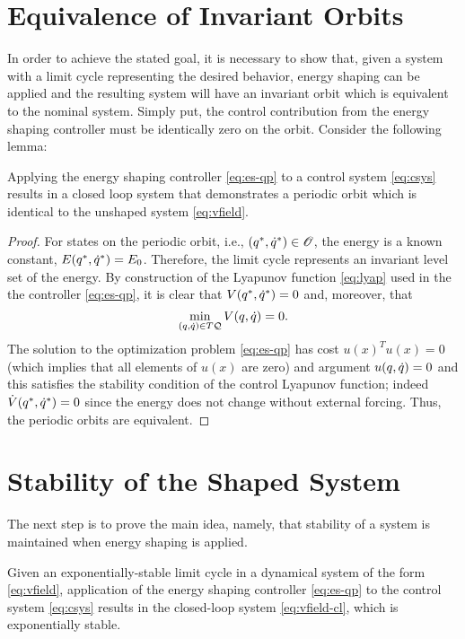\documentclass[twocolumn]{article}
\begin{document}
\section{Equivalence of Invariant Orbits}
In order to achieve the stated goal, it is necessary to show that, given a system with a limit cycle representing the desired behavior, energy shaping can be applied and the resulting system will have an invariant orbit which is equivalent to the nominal system. Simply put, the control contribution from the energy shaping controller must be identically zero on the orbit. Consider the following lemma:

\begin{lemma}
  Applying the energy shaping controller \eqref{eq:es-qp} to a control system \eqref{eq:csys} results in a closed loop system that demonstrates a periodic orbit which is identical to the unshaped system \eqref{eq:vfield}.
\end{lemma}

\begin{proof}
  For states on the periodic orbit, i.e., $(q^{*}, \dot{q}^{*}) \in \mathscr{O}$, the energy is a known constant, $E(q^{*}, \dot{q}^{*}) = E_{0}$.
  Therefore, the limit cycle represents an invariant level set of the energy.
  By construction of the Lyapunov function \eqref{eq:lyap} used in the the controller \eqref{eq:es-qp}, it is clear that $V(q^{*}, \dot{q}^{*}) = 0$ and, moreover, that $$\min_{(q, \dot{q}) \in T\mathcal{Q}} V(q, \dot{q}) = 0.$$
  The solution to the optimization problem \eqref{eq:es-qp} has cost $u(x)^T u(x) = 0$ (which implies that all elements of $u(x)$ are zero) and argument $u(q, \dot{q}) = 0$ and this satisfies the stability condition of the control Lyapunov function; indeed ${\dot V}(q^{*}, \dot{q}^{*}) = 0$ since the energy does not change without external forcing.
  Thus, the periodic orbits are equivalent.
\end{proof}

\section{Stability of the Shaped System}

The next step is to prove the main idea, namely, that stability of a system is maintained when energy shaping is applied.

\begin{theorem}
  Given an exponentially-stable limit cycle in a dynamical system of the form \eqref{eq:vfield}, application of the energy shaping controller \eqref{eq:es-qp} to the control system \eqref{eq:csys} results in the closed-loop system \eqref{eq:vfield-cl}, which is exponentially stable.
\end{theorem}
\end{document}
